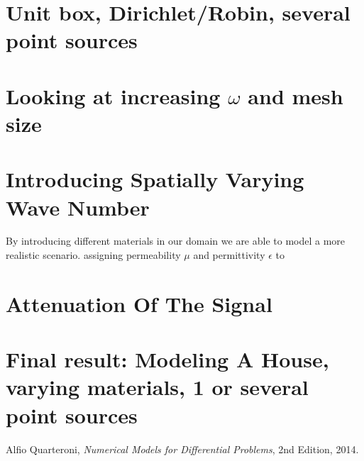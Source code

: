 \documentclass[10pt,a4paper]{article}
\begin{document}
\section*{Unit box, Dirichlet/Robin, several point sources }


\section*{Looking at increasing $\omega$ and mesh size}

\section*{Introducing Spatially Varying Wave Number}
By introducing different materials in our domain we are able to model a more realistic scenario.  assigning permeability $\mu$ and permittivity $\epsilon$ to  

\section*{Attenuation Of The Signal}


\section*{Final result: Modeling A House, varying materials, 1 or several point sources }






\begin{thebibliography}{}

Alfio Quarteroni, \emph{Numerical Models for Differential Problems}, 2nd Edition, 2014.

\end{thebibliography}
\end{document}
